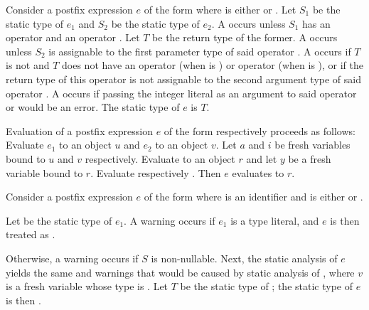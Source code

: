 \documentclass[makeidx]{article}
\begin{document}
\LMHash{}%
Consider a postfix expression $e$ of the form 
where \op{} is either \lit{++} or \lit{-{}-}.
Let $S_1$ be the static type of $e_1$
and $S_2$ be the static type of $e_2$.
A  occurs unless $S_1$ has
an operator \lit{[]} and an operator \lit{[]=}.
Let $T$ be the return type of the former.
A  occurs unless $S_2$ is assignable to
the first parameter type of said operator \lit{[]=}.
A  occurs if $T$ is not \DYNAMIC{}
and $T$ does not have an operator \lit{+} (when \op{} is \lit{++})
or operator \lit{-} (when \op{} is \lit{-{}-}),
or if the return type of this operator is not assignable to
the second argument type of said operator \lit{[]=}.
A  occurs if passing the integer literal 
as an argument to said operator \lit{+} or \lit{-} would be an error.
The static type of $e$ is $T$.

\LMHash{}%
Evaluation of a postfix expression $e$
of the form  respectively 
proceeds as follows:
Evaluate $e_1$ to an object $u$ and $e_2$ to an object $v$.
Let $a$ and $i$ be fresh variables bound to $u$ and $v$ respectively.
Evaluate  to an object $r$
and let $y$ be a fresh variable bound to $r$.
Evaluate  respectively .
Then $e$ evaluates to $r$.
\EndCase

\LMHash{}%
Consider a postfix expression $e$ of the form 
where \id{} is an identifier and \op{} is either \lit{++} or \lit{-{}-}.

\LMHash{}%
Let  be the static type of $e_1$.
A warning occurs if $e_1$ is a type literal,
and $e$ is then treated as .

\LMHash{}%
Otherwise, a warning occurs if $S$ is non-nullable.
Next, the static analysis of $e$ yields
the same  and warnings that would be caused by
static analysis of ,
where $v$ is a fresh variable whose type is .
Let $T$ be the static type of ;
the static type of $e$ is then .
\end{document}

